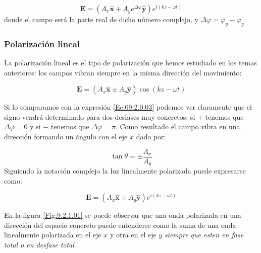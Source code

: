 \documentclass[12pt,a4paper]{article}
\newcommand{\En}{\mathbf{E}}
\newcommand{\hnx}{\hat{\mathbf{x}}}
\newcommand{\hny}{\hat{\mathbf{y}}}
\numberwithin{equation}{section}
\numberwithin{figure}{section}
\begin{document}
\begin{equation}
\En = ( A_x \hnx +  A_y e^{\Delta \varphi} \hny) e^{i (kz - \omega t)} \label{Ec:09.2.0.03}
\end{equation}
donde el campo será la parte real de dicho número complejo, y $\Delta \varphi = \varphi_y - \varphi_y$.

\subsubsection{Polarización lineal}

La polarización lineal es el tipo de polarización que hemos estudiado en los temas anteriores: los campos vibran siempre en la misma dirección del movimiento:


\begin{equation}
 \En = (A_x \hnx \pm  A_y \hny) \cos (kz-\omega t)
\end{equation}

Si lo comparamos con la expresión \ref{Ec:09.2.0.03} podemos ver claramente que el signo vendrá determinado para dos desfases muy concretos: si $+$ tenemos que $\Delta \varphi = 0$ y si $-$ tenemos que $\Delta \varphi = \pi$. Como resultado el campo vibra en una dirección formando un ángulo con el eje $x$ dado por:

\begin{equation}
\tan \theta = \pm \dfrac{A_x}{A_y}
\end{equation}
Siguiendo la notación complejo la luz linealmente polarizada puede expresarse como:

\begin{equation}
 \En = (A_x \hnx  \pm A_y \hny) e^{i (kz-\omega t)}
\end{equation}

En la figura \ref{Fig:9.2.1.01} se puede observar que una onda polarizada en una dirección del espacio concreto puede entenderse como la suma de una onda linealmente polarizada en el eje $x$ y otra en el eje $y$ \textit{siempre que esten en fase total o en desfase total}.
\end{document}
